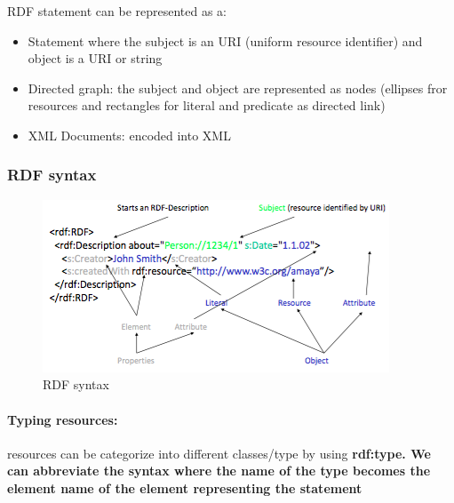 RDF statement can be represented as a:
\begin{itemize}
\item Statement where the subject is an URI (uniform resource identifier) and object is a URI or string
\item Directed graph: the subject and object are represented as nodes (ellipses fror resources and rectangles for literal and predicate as directed link)
\item XML Documents: encoded into XML
\end{itemize}

\subsubsection{RDF syntax}
\begin{figure}[H]
\begin{center}
\includegraphics[width=1\linewidth]{figures/rdf.png}
\end{center}
\caption{RDF syntax}
\end{figure}

\paragraph{Typing resources:} resources can be categorize into different classes/type by using \bf{rdf:type}. We can abbreviate the syntax where the name of the type becomes the element name of the element representing the statement

